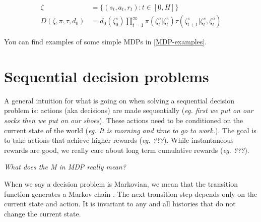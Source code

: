 
\begin{align}
\zeta &= \{(s_t, a_t, r_t) : t \in [0, H]\} \tag{trajectory} \\
D(\zeta, \pi, \tau, d_0) &= d_0(\zeta^s_0) \prod_{t=1}^{\infty} \pi(\zeta^a_t|\zeta^s_t) \tau(\zeta^s_{t+1}|\zeta^s_t, \zeta^a_t) \tag{p($\zeta$)}
\end{align}


You can find examples of some simple MDPs in \ref{MDP-examples}.

\section{Sequential decision problems}

A general intuition for what is going on when solving a sequential decision problem is: actions (aka decisions) are made
sequentially (\textit{eg. first we put on our socks then we put on our shoes}).
These actions need to be conditioned on the current state of the world (\textit{eg. It is morning and time to go to work.}).
The goal is to take actions that achieve higher rewards (\textit{eg. ???}). While instantaneous
rewards are good, we really care about long term cumulative rewards (\textit{eg. ???}).


\begin{displayquote}
  \textit{What does the M in MDP really mean?}
\end{displayquote}

When we say a decision problem is Markovian, we mean that the transition
function generates a Markov chain \cite{Markov2006}. The next transition step depends only
on the current state and action. It is invariant to any and all histories that do not
change the current state. \footnotemark[18]


